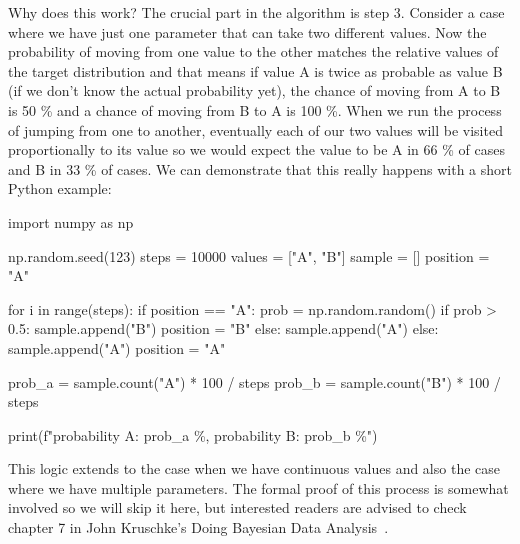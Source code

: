\documentclass[12pt,a4paper,leqno]{report}
\theoremstyle{plain}
\theoremstyle{definition}
\theoremstyle{remark}
\begin{document}
Why does this work? The crucial part in the algorithm is step 3. Consider a case
where we have just one parameter that can take two different values. Now the probability
of moving from one value to the other matches the relative values of the
target distribution and that means if value A is twice as probable as value B (if we don't know the
actual probability yet), the chance of moving from A to B is 50 \% and a chance of moving
from B to A is 100 \%. When we run the process of jumping from one to another, eventually each of our two values
will be visited proportionally to its value so we would expect the value to be A in 66
\% of cases and B in 33 \% of cases. We can demonstrate that this really happens with a short Python
example:

\begin{pyblock}[][fontsize=\footnotesize]
import numpy as np

np.random.seed(123)
steps = 10000
values = ["A", "B"]
sample = []
position = "A"

for i in range(steps):
    if position == "A":
        prob = np.random.random()
        if prob > 0.5:
            sample.append("B")
            position = "B"
        else:
            sample.append("A")
    else:
        sample.append("A")
        position = "A"

prob_a = sample.count("A") * 100 / steps
prob_b = sample.count("B") * 100 / steps

print(f"probability A: {prob_a} \%, probability B: {prob_b} \%")
\end{pyblock}
\stdoutpythontex
\bigskip

This logic extends to the case when we have
continuous values and also the case where we have multiple parameters. The formal proof
of this process is somewhat involved so we will skip it here, but interested readers are
advised to check chapter 7 in John Kruschke's Doing Bayesian Data Analysis\ \cite{kruschke}.
\end{document}
